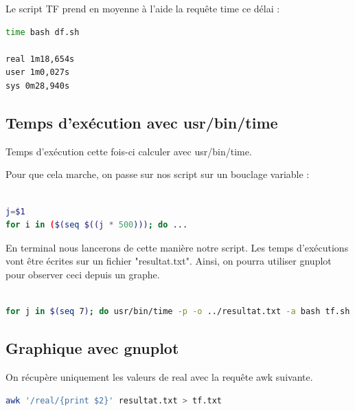 \documentclass{article}
\begin{document}
Le script TF prend en moyenne à l'aide la requête time ce délai :

\begin{lstlisting}[language=bash,caption={Suppression}]
time bash df.sh

real 1m18,654s
user 1m0,027s
sys 0m28,940s
\end{lstlisting}

\subsection{Temps d'exécution avec usr/bin/time}
\label{labeltime}

Temps d'exécution cette fois-ci calculer avec usr/bin/time.

Pour que cela marche, on passe sur nos script sur un bouclage variable :
\begin{lstlisting}[language=bash,caption={Bouclage variable}]

j=$1
for i in ($(seq $((j * 500))); do ...

\end{lstlisting}

En terminal nous lancerons de cette manière notre script.
Les temps d'exécutions vont être écrites sur un fichier "resultat.txt". Ainsi, on pourra utiliser gnuplot pour observer ceci depuis un graphe.

\begin{lstlisting}[language=bash,caption={Requête d'exécution}]

for j in $(seq 7); do usr/bin/time -p -o ../resultat.txt -a bash tf.sh $j; done

\end{lstlisting}

\subsection{Graphique avec gnuplot}

On récupère uniquement les valeurs de real avec la requête awk suivante.
 
\begin{lstlisting}[language=bash,caption={Fichier à plot}]
awk '/real/{print $2}' resultat.txt > tf.txt
\end{lstlisting}
\end{document}

